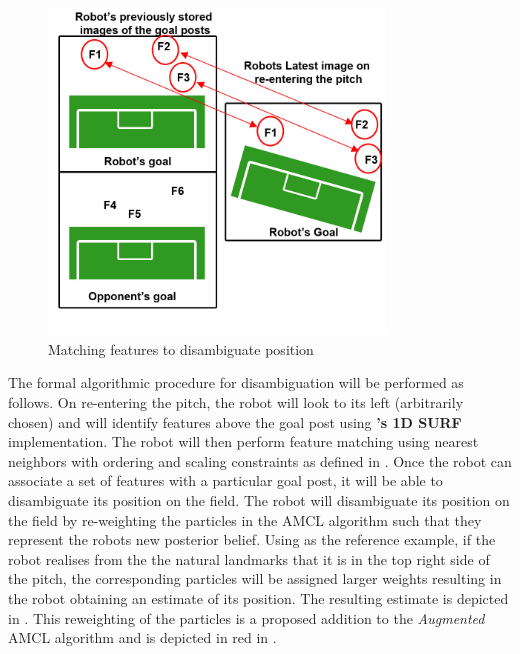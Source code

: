 \documentclass{report}
\begin{document}
\begin{figure}[h!] 
  \centering
    \includegraphics[width=0.8\textwidth]{../Drawings/localisation/featureMatching.jpg}
    \caption{Matching features to disambiguate position}
    \label{fig:featureMatching}
\end{figure}

The formal algorithmic procedure for disambiguation will be performed as follows. On re-entering the pitch, the robot will look to its left (arbitrarily chosen) and will identify features above the goal post using \textbf{\cite{Anderson}'s 1D SURF} implementation. The robot will then perform feature matching using nearest neighbors with ordering and scaling constraints as defined in \cite{Anderson}. Once the robot can associate a set of features with a particular goal post, it will be able to disambiguate its position on the field. The robot will disambiguate its position on the field by re-weighting the particles in the AMCL algorithm such that they represent the robots new posterior belief. Using  as the reference example, if the robot realises from the the natural landmarks that it is in the top right side of the pitch, the corresponding particles will be assigned larger weights resulting in the robot obtaining an estimate of its position. The resulting estimate is depicted in . This reweighting of the particles is a proposed addition to the \textit{Augmented} AMCL algorithm and is depicted in red in .\\
\end{document}
